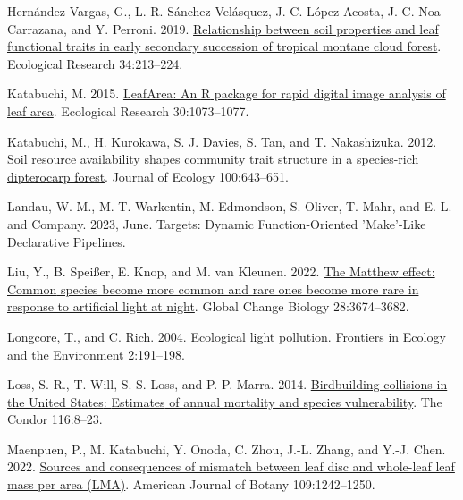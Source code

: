 \documentclass[
  12pt,
  letterpaper,
  DIV=11,
  numbers=noendperiod]{scrartcl}
\newlength{\cslhangindent}
\newlength{\cslentryspacingunit} %
\newenvironment{CSLReferences}[2] %
 {%
  \setlength{\parindent}{0pt}
  \ifodd #1
  \let\oldpar\par
  \def\par{\hangindent=\cslhangindent\oldpar}
  \fi
  \setlength{\parskip}{#2\cslentryspacingunit}
 }%
 {}
\begin{document}
\begin{CSLReferences}{1}{0}
\leavevmode{}%
Hernández-Vargas, G., L. R. Sánchez-Velásquez, J. C. López-Acosta, J. C.
Noa-Carrazana, and Y. Perroni. 2019.
\href{https://doi.org/10.1111/1440-1703.1267}{Relationship between soil
properties and leaf functional traits in early secondary succession of
tropical montane cloud forest}. Ecological Research 34:213--224.

\leavevmode{}%
Katabuchi, M. 2015.
\href{https://doi.org/10.1007/s11284-015-1307-x}{{LeafArea}: An {R}
package for rapid digital image analysis of leaf area}. Ecological
Research 30:1073--1077.

\leavevmode{}%
Katabuchi, M., H. Kurokawa, S. J. Davies, S. Tan, and T. Nakashizuka.
2012. \href{https://doi.org/10.1111/j.1365-2745.2011.01937.x}{Soil
resource availability shapes community trait structure in a species-rich
dipterocarp forest}. Journal of Ecology 100:643--651.

\leavevmode{}%
Landau, W. M., M. T. Warkentin, M. Edmondson, S. Oliver, T. Mahr, and E.
L. and Company. 2023, June. Targets: {Dynamic Function-Oriented}
'{Make}'-{Like Declarative Pipelines}.

\leavevmode{}%
Liu, Y., B. Speißer, E. Knop, and M. van Kleunen. 2022.
\href{https://doi.org/10.1111/gcb.16126}{The {Matthew} effect: {Common}
species become more common and rare ones become more rare in response to
artificial light at night}. Global Change Biology 28:3674--3682.

\leavevmode{}%
Longcore, T., and C. Rich. 2004.
\href{https://doi.org/10.1890/1540-9295(2004)002\%5B0191:ELP\%5D2.0.CO;2}{Ecological
light pollution}. Frontiers in Ecology and the Environment 2:191--198.

\leavevmode{}%
Loss, S. R., T. Will, S. S. Loss, and P. P. Marra. 2014.
\href{https://doi.org/10.1650/CONDOR-13-090.1}{Bird\textendash building
collisions in the {United States}: {Estimates} of annual mortality and
species vulnerability}. The Condor 116:8--23.

\leavevmode{}%
Maenpuen, P., M. Katabuchi, Y. Onoda, C. Zhou, J.-L. Zhang, and Y.-J.
Chen. 2022. \href{https://doi.org/10.1002/ajb2.16038}{Sources and
consequences of mismatch between leaf disc and whole-leaf leaf mass per
area ({LMA})}. American Journal of Botany 109:1242--1250.


\end{CSLReferences}
\end{document}
